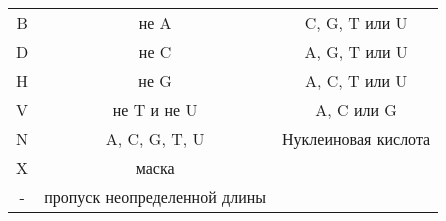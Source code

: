 \documentclass{article}
\begin{document}
\begin{table}[h]
\begin{center}
\begin{tabular}{|c|c|c|}
                                    B & не A          & C, G, T или U \\
                                    D & не C          & A, G, T или U \\
                                    H & не G          & A, C, T или U \\
                                    V & не T и не U   & A, C или G \\
                                    N & A, C, G, T, U & Нуклеиновая кислота \\
                                    X & маска         &  \\
                                    - & пропуск неопределенной длины &  \\                                    
                                    \hline
                                \end{tabular}
                            \end{center}
                        \end{table}
\end{document}
